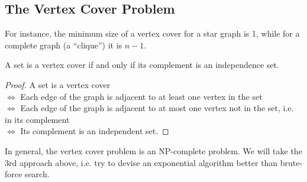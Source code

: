 \subsection{The Vertex Cover Problem}
\begin{description}
\end{description}
For instance, the minimum size of a vertex cover for a star graph is 1, while for a complete graph (a ``clique'') it is $n-1$. 
\begin{theorem}
A set is a vertex cover if and only if its complement is an independence set.
\end{theorem}
\begin{proof}
A set is a vertex cover \\
$\iff$ Each edge of the graph is adjacent to at least one vertex in the set \\
$\iff$ Each edge of the graph is adjacent to at most one vertex not in the set, i.e. in its complement\\
$\iff$ Its complement is an independent set.
\end{proof}
In general, the vertex cover problem is an NP-complete problem. We will take the 3rd approach above, i.e. try to devise an exponential algorithm better than brute-force search.

